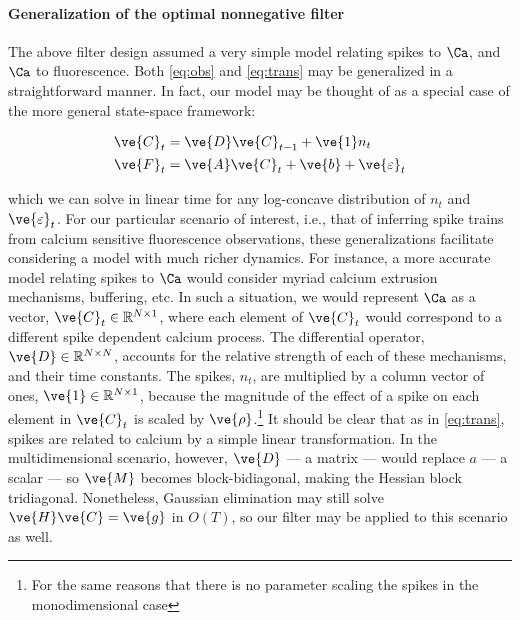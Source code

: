 \paragraph{Generalization of the optimal nonnegative filter}

The above filter design assumed a very simple model relating spikes to $\Ca$, and $\Ca$ to fluorescence.  Both \eqref{eq:obs} and \eqref{eq:trans} may be generalized in a straightforward manner. In fact, our model may be thought of as a special case of the more general state-space framework:

\begin{subequations} \label{eq:SS}
\begin{align}
\ve{C}_t &= \ve{D} \ve{C}_{t-1} + \ve{1} n_t \label{eq:SSa} \\
\ve{F}_t &= \ve{A} \ve{C}_t + \ve{b} + \ve{\varepsilon}_t \label{eq:SSb}
\end{align}
\end{subequations}

\noindent which we can solve in linear time for any log-concave distribution of $n_t$ and $\ve{\varepsilon}_t$.  For our particular scenario of interest, i.e., that of inferring spike trains from calcium sensitive fluorescence observations, these generalizations facilitate considering a model with much richer dynamics.  For instance, a more accurate model relating spikes to $\Ca$ would consider myriad calcium extrusion mechanisms, buffering, etc. In such a situation, we would represent $\Ca$ as a vector, $\ve{C}_t \in \mathbb{R}^{N \times 1}$, where each element of $\ve{C}_t$ would correspond 
%
%
%
to a different spike dependent calcium process. The differential operator, $\ve{D} \in \mathbb{R}^{N \times N}$, accounts for the relative strength of each of these mechanisms, and their time constants. The spikes, $n_t$, are multiplied by a column vector of ones, $\ve{1} \in \mathbb{R}^{N \times 1}$, because the magnitude of the effect of a spike on each element in $\ve{C}_t$ is scaled by $\ve{\rho}$.\footnote{For the same reasons that there is no parameter scaling the spikes in the monodimensional case} It should be clear that as in \eqref{eq:trans}, spikes are related to calcium by a simple linear transformation.  In the multidimensional scenario, however, $\ve{D}$ --- a matrix --- would replace $a$ --- a scalar ---  so $\ve{M}$ becomes block-bidiagonal, making the Hessian block tridiagonal.  Nonetheless, Gaussian elimination may still solve $\ve{H}\ve{C}=\ve{g}$ in $O(T)$, so our filter may be applied to this scenario as well.

